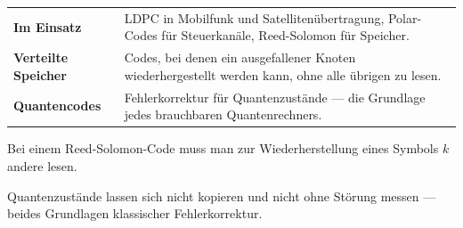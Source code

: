 \begin{forschung}
\begin{center}
{\small
\renewcommand{\arraystretch}{1.45}
\begin{tabular}{@{}P{2.8cm}P{5.4cm}@{}}
\toprule
\textbf{Im Einsatz} & LDPC in Mobilfunk und Satellitenübertragung, Polar-Codes für Steuerkanäle, Reed-Solomon für Speicher.\\
\textbf{Verteilte Speicher} & Codes, bei denen ein ausgefallener Knoten wiederhergestellt werden kann, ohne alle übrigen zu lesen.\\
\textbf{Quantencodes} & Fehlerkorrektur für Quantenzustände --- die Grundlage jedes brauchbaren Quantenrechners.\\
\bottomrule
\end{tabular}}
\end{center}

Bei einem Reed-Solomon-Code muss man zur Wiederherstellung eines Symbols $k$ andere lesen.

\begin{center}
\begin{minipage}{0.88\textwidth}
\end{minipage}
\end{center}

Quantenzustände lassen sich nicht kopieren und nicht ohne Störung messen --- beides Grundlagen klassischer Fehlerkorrektur.

\begin{center}
\begin{minipage}{0.88\textwidth}
\end{minipage}
\end{center}
\end{forschung}

